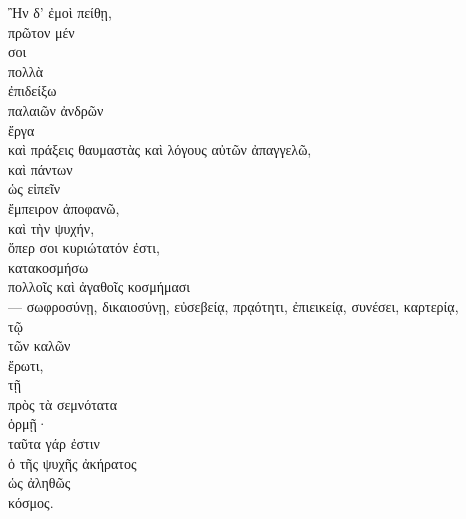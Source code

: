 

{\large
\begin{greek}
\noindent  Ἢν δ' ἐμοὶ πείθῃ, \\
\tabto{2em} πρῶτον μέν \\
\tabto{2em} σοι \\
\tabto{2em} πολλὰ \\
\tabto{4em} ἐπιδείξω \\
\tabto{6em} παλαιῶν ἀνδρῶν \\
\tabto{2em} ἔργα \\
\tabto{4em} καὶ πράξεις θαυμαστὰς καὶ λόγους αὐτῶν ἀπαγγελῶ, \\
\tabto{4em} καὶ πάντων \\
\tabto{6em} ὡς εἰπεῖν \\
\tabto{4em} ἔμπειρον ἀποφανῶ, \\
\tabto{4em} καὶ τὴν ψυχήν, \\
\tabto{6em} ὅπερ σοι κυριώτατόν ἐστι, \\
\tabto{4em} κατακοσμήσω \\
\tabto{6em} πολλοῖς καὶ ἀγαθοῖς κοσμήμασι\\
\tabto{6em} — σωφροσύνῃ, δικαιοσύνῃ, εὐσεβείᾳ, πρᾳότητι, ἐπιεικείᾳ, συνέσει, καρτερίᾳ, \\
\tabto{6em} τῷ \\
\tabto{8em} τῶν καλῶν \\
\tabto{6em} ἔρωτι, \\
\tabto{6em} τῇ \\
\tabto{8em} πρὸς τὰ σεμνότατα \\
\tabto{6em} ὁρμῇ· \\
\tabto{8em} ταῦτα γάρ ἐστιν \\
\tabto{10em} ὁ τῆς ψυχῆς ἀκήρατος \\
\tabto{12em} ὡς ἀληθῶς \\
\tabto{10em} κόσμος.\\

\end{greek}
}

